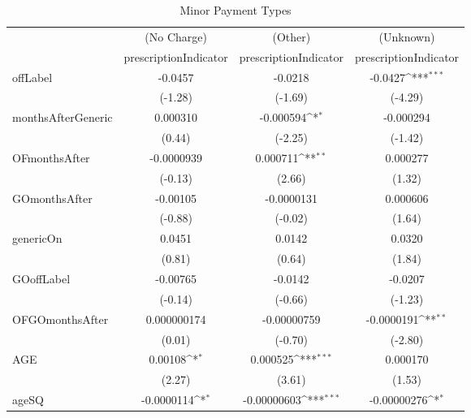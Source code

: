 \begin{table}[htbp]\centering
\def\sym#1{\ifmmode^{#1}\else\(^{#1}\)\fi}
\caption{Minor Payment Types\label{tab1}}
\begin{tabular}{l*{3}{c}}
\hline\hline
            &\multicolumn{1}{c}{(No Charge)}&\multicolumn{1}{c}{(Other)}&\multicolumn{1}{c}{(Unknown)}\\
            &\multicolumn{1}{c}{prescriptionIndicator}&\multicolumn{1}{c}{prescriptionIndicator}&\multicolumn{1}{c}{prescriptionIndicator}\\
\hline
offLabel    &     -0.0457         &     -0.0218         &     -0.0427\sym{***}\\
            &     (-1.28)         &     (-1.69)         &     (-4.29)         \\
[1em]
monthsAfterGeneric&    0.000310         &   -0.000594\sym{*}  &   -0.000294         \\
            &      (0.44)         &     (-2.25)         &     (-1.42)         \\
[1em]
OFmonthsAfter&  -0.0000939         &    0.000711\sym{**} &    0.000277         \\
            &     (-0.13)         &      (2.66)         &      (1.32)         \\
[1em]
GOmonthsAfter&    -0.00105         &  -0.0000131         &    0.000606         \\
            &     (-0.88)         &     (-0.02)         &      (1.64)         \\
[1em]
genericOn   &      0.0451         &      0.0142         &      0.0320         \\
            &      (0.81)         &      (0.64)         &      (1.84)         \\
[1em]
GOoffLabel  &    -0.00765         &     -0.0142         &     -0.0207         \\
            &     (-0.14)         &     (-0.66)         &     (-1.23)         \\
[1em]
OFGOmonthsAfter& 0.000000174         & -0.00000759         &  -0.0000191\sym{**} \\
            &      (0.01)         &     (-0.70)         &     (-2.80)         \\
[1em]
AGE         &     0.00108\sym{*}  &    0.000525\sym{***}&    0.000170         \\
            &      (2.27)         &      (3.61)         &      (1.53)         \\
[1em]
ageSQ       &  -0.0000114\sym{*}  & -0.00000603\sym{***}& -0.00000276\sym{*}  \\

\end{tabular}
\end{table}

